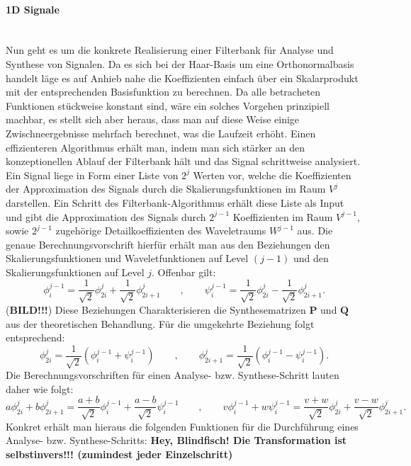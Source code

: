 \documentclass{article}
\begin{document}
\paragraph{1D Signale}~\\
Nun geht es um die konkrete Realisierung einer Filterbank für Analyse und Synthese von Signalen. Da es sich bei der Haar-Basis um eine Orthonormalbasis handelt läge es auf Anhieb nahe die Koeffizienten einfach über ein Skalarprodukt mit der entsprechenden Basisfunktion zu berechnen. Da alle betracheten Funktionen stückweise konstant sind, wäre ein solches Vorgehen prinzipiell machbar, es stellt sich aber heraus, dass man auf diese Weise einige Zwischneergebnisse mehrfach berechnet, was die Laufzeit erhöht. Einen effizienteren Algorithmus erhält man, indem man sich stärker an den konzeptionellen Ablauf der Filterbank hält und das Signal schrittweise analysiert.
%
Ein Signal liege in Form einer Liste von $2^j$ Werten vor, welche die Koeffizienten der Approximation des Signals durch die Skalierungsfunktionen im Raum $V^j$ darstellen. Ein Schritt des Filterbank-Algorithmus erhält diese Liste als Input und gibt die Approximation des Signals durch $2^{j-1}$ Koeffizienten im Raum $V^{j-1}$, sowie $2^{j-1}$ zugehörige Detailkoeffizienten des Waveletraums $W^{j-1}$ aus. Die genaue Berechnungsvorschrift hierfür erhält man aus den Beziehungen den Skalierungsfunktionen und Waveletfunktionen auf Level $(j-1)$ und den Skalierungsfunktionen auf Level $j$. Offenbar gilt:
%
\[
\phi_{i}^{j-1} = \frac{1}{\sqrt{2}} \phi_{2i}^{j} + \frac{1}{\sqrt{2}} \phi_{2i+1}^{j} 
\qquad , \qquad
\psi_{i}^{j-1} = \frac{1}{\sqrt{2}} \phi_{2i}^{j} - \frac{1}{\sqrt{2}} \phi_{2i+1}^{j}
.
\]
%
(\textbf{BILD!!!}) Diese Beziehungen Charakterisieren die Synthesematrizen $\mathbf{P}$ und $\mathbf{Q}$ aus der theoretischen Behandlung. Für die umgekehrte Beziehung folgt entsprechend:
%
\[
\phi_{2i}^{j} = \frac{1}{\sqrt{2}} (\phi_{i}^{j-1} + \psi_{i}^{j-1})
\qquad , \qquad
\phi_{2i+1}^{j} = \frac{1}{\sqrt{2}} (\phi_{i}^{j-1} - \psi_{i}^{j-1})
.
\]
%
Die Berechnungsvorschriften für einen Analyse- bzw. Synthese-Schritt lauten daher wie folgt:
%
\[
a \phi_{2i}^{j} + b \phi_{2i+1}^{j} = \frac{a + b}{\sqrt{2}} \phi_{i}^{j-1} + \frac{a - b}{\sqrt{2}} \psi_{i}^{j-1}
\qquad , \qquad
v \phi_{i}^{j-1} + w \psi_{i}^{j-1} = \frac{v + w}{\sqrt{2}} \phi_{2i}^{j} + \frac{v - w}{\sqrt{2}} \phi_{2i+1}^{j}
.
\]
%
Konkret erhält man hieraus die folgenden Funktionen für die Durchführung eines Analyse- bzw. Synthese-Schritts: \textbf{Hey, Blindfisch! Die Transformation ist selbstinvers!!! (zumindest jeder Einzelschritt)}
\end{document}
